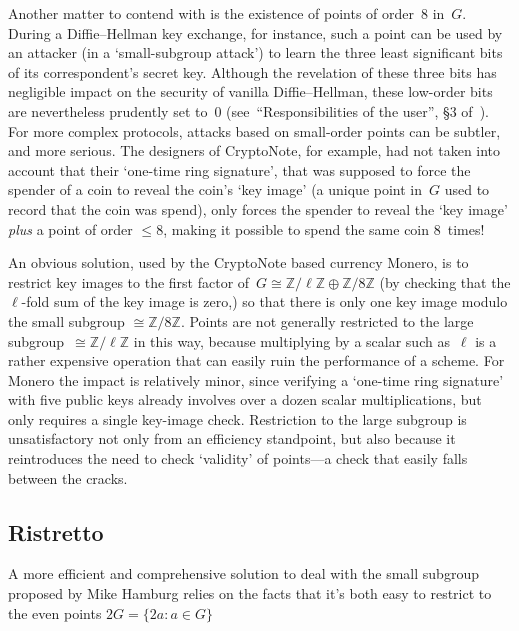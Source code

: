 \documentclass{amsproc}
\newcommand{\Z}{\mathbb{Z}}
\begin{document}
Another matter to contend with
is the existence of points of order~$8$ in~$G$.
During a Diffie--Hellman key exchange, for instance,
such a point can be used by an attacker
(in a `small-subgroup attack')
to learn the three least significant
bits of its correspondent's secret key.
Although the revelation of these three bits has
negligible impact on the security of vanilla Diffie--Hellman,
these low-order bits are nevertheless prudently set to~$0$
(see~``Responsibilities of the user'', \S3 of~\cite{x25519}).
For more complex protocols,
attacks based on small-order points
can be subtler, and more serious.
The designers of CryptoNote\cite{cryptonote},
for example,
had not taken into account\cite{monero-disclosure,monero-curves-post}
that
their `one-time ring signature',
that was supposed to force the spender of a coin
to reveal the coin's `key image'
(a unique point in~$G$ used to record that the coin was spend),
only forces the spender to reveal
the `key image' \emph{plus} a point of order $\leq 8$,
making it possible to spend the same coin 8~times!

An obvious solution,
used by the CryptoNote based 
currency Monero\cite{monero-fix},
is to restrict
key images
to the first factor of~$G\cong \Z/\ell\Z \oplus \Z/8\Z$
(by checking that the $\ell$-fold sum of the key image is zero,)
so that there is only one key image modulo
the small subgroup $\cong \Z/8\Z$.
Points are not generally restricted to
the large subgroup~$\cong \Z/\ell\Z$ in this way,
because multiplying by a scalar such as~$\ell$
is a rather expensive operation
that can easily ruin the performance of a scheme.
For Monero the impact is relatively minor,
since verifying a `one-time ring signature' with five
public keys already involves over a dozen scalar multiplications,
but only requires a single key-image check.
Restriction to the large subgroup is unsatisfactory not only from 
an efficiency standpoint, but also because it reintroduces
the need to check `validity' of points---a check that easily
falls between the cracks.

\subsection{Ristretto}
A more efficient and comprehensive
solution to deal with the small subgroup 
proposed by Mike Hamburg
relies on the facts that 
it's both easy to restrict to the even
points $2G=\{2a\colon a\in G\}$
\end{document}
